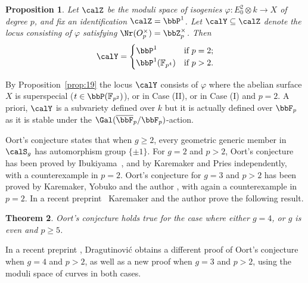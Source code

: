 \documentclass[]{amsart}
\theoremstyle{plain}
\newtheorem{thm}{Theorem}
\newtheorem{prop}[thm]{Proposition}
\theoremstyle{definition}
\theoremstyle{remark}
\def\Fpbar{\overline{\bbF}_p}
\def\Fp{{\bbF}_p}
\def\Zp{{\bbZ}_p}
\newcommand{\F}{\mathbb F}
\newcommand{\<}{\langle}   %
\renewcommand{\>}{\rangle} %
\begin{document}
\begin{prop}
    Let $\calZ$ be the moduli space of isogenies $\varphi: E_0^2\otimes k\to X$ of degree $p$, and fix an identification $\calZ=\bbP^1$.
    Let $\calY\subseteq \calZ$ denote the locus consisting of $\varphi$ satisfying $\Nr(O_p^\times)=\Zp^\times$. Then 
    \[ \calY=\begin{cases}
        \bbP^1 & \text{if $p=2$;} \\
        \bbP^1(\F_{p^4}) & \text{if $p>2$.} 
    \end{cases}\]    
\end{prop}
By Proposition~\ref{prop:19} the locus $\calY$ consists of $\varphi$ where the abelian surface $X$ is  superspecial ($t\in \bbP(\F_{p^2})$), or in Case (II), or in Case (I) and $p=2$. A priori, $\calY$ is a subvariety defined over $k$ but it is actually defined over $\Fp$ as it is stable under the $\Gal(\Fpbar/\Fp)$-action. 


Oort's conjecture \cite[Question 4]{edixhoven-moonen-oort} states that when $g\ge 2$, every geometric generic member in $\calS_g$ has automorphism group $\{\pm1 \}$.
For $g=2$ and $p>2$, Oort's conjecture has been proved by Ibukiyama~\cite{ibukiyama:ppas}, and by Karemaker and Pries \cite{karemaker-pries} independently, with a counterexample in  $p=2$. Oort's conjecture for $g=3$ and $p>2$ has been proved by Karemaker, Yobuko and the author \cite{KYY}, with again a counterexample in $p=2$. In a recent preprint~\cite{karemaker-yu:sseooc} Karemaker and the author prove the following result.

\begin{thm}
    Oort’s conjecture holds true for the case where either $g=4$, or $g$ is even and $p \ge 5$.
\end{thm}

In a recent preprint \cite{dusan}, Dragutinovi{\'c} obtains a different proof of Oort's conjecture when $g=4$ and $p>2$, as well as a new proof when $g=3$ and $p>2$, using the moduli space of curves in both cases.

\end{document}
